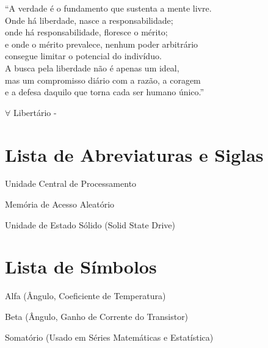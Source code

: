 \documentclass[a4paper,12pt,brazilian,oneside]{Arquivos/Relatorio}
\begin{document}
\begin{epigrafe}
    ``A verdade é o fundamento que sustenta a mente livre.\\
    Onde há liberdade, nasce a responsabilidade;\\
    onde há responsabilidade, floresce o mérito;\\
    e onde o mérito prevalece, nenhum poder arbitrário\\
    consegue limitar o potencial do indivíduo.\\
    A busca pela liberdade não é apenas um ideal,\\
    mas um compromisso diário com a razão, a coragem\\
    e a defesa daquilo que torna cada ser humano único.''
    
    $\forall$ Libertário - \WenesTex
\end{epigrafe}









\listoffigures
\listoftables

\chapter*{Lista de Abreviaturas e Siglas}
\begin{siglas}
    \item[CPU] Unidade Central de Processamento
    \item[RAM] Memória de Acesso Aleatório
    \item[SSD] Unidade de Estado Sólido (Solid State Drive)
\end{siglas}

\chapter*{Lista de Símbolos}
\begin{simbolos}
    \item[$\alpha$] Alfa (Ângulo, Coeficiente de Temperatura)
    \item[$\beta$] Beta (Ângulo, Ganho de Corrente do Transistor)
    \item[$\sum$] Somatório (Usado em Séries Matemáticas e Estatística)
\end{simbolos}
\end{document}
